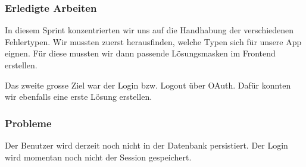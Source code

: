 \subsubsection{Erledigte Arbeiten}
In diesem Sprint konzentrierten wir uns auf die Handhabung der verschiedenen Fehlertypen.
Wir mussten zuerst herausfinden, welche Typen sich für unsere App eignen.
Für diese mussten wir dann passende Lösungsmasken im Frontend erstellen.

Das zweite grosse Ziel war der Login bzw. Logout über OAuth. Dafür konnten wir ebenfalls eine erste Lösung erstellen.

\subsubsection{Probleme}
Der Benutzer wird derzeit noch nicht in der Datenbank persistiert. Der Login wird momentan noch nicht der Session gespeichert.